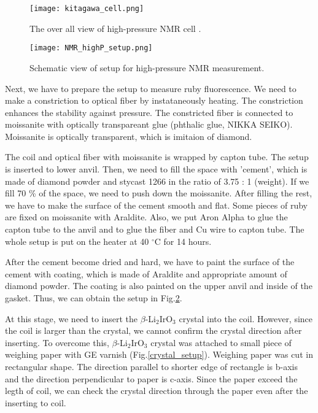 \documentclass[a4,10.5pt]{report}
\begin{document}
\begin{figure}[H]
  \centering
  \texttt{[image: kitagawa\_cell.png]}
  \caption{The over all view of high-pressure NMR cell \cite{Kitagawa2010}.}
  \label{kitagawa_cell}
\end{figure}

\begin{figure}
  \centering
  \texttt{[image: NMR\_highP\_setup.png]}
  \caption{Schematic view of setup for high-pressure NMR measurement.}
  \label{NMR_highP_setup}
\end{figure}

Next, we have to prepare the setup to measure ruby fluorescence.
We need to make a constriction to optical fiber by instataneously heating.
The constriction enhances the stability against pressure.
The constricted fiber is connected to moissanite with optically transpareant glue (phthalic glue, NIKKA SEIKO).
Moissanite is optically transparent, which is imitaion of diamond.

The coil and optical fiber with moissanite is wrapped by capton tube.
The setup is inserted to lower anvil.
Then, we need to fill the space with 'cement', which is made of diamond powder and stycast 1266 in the ratio of 3.75 : 1 (weight).
If we fill 70 \% of the space, we need to push down the moissanite.
After filling the rest, we have to make the surface of the cement smooth and flat.
Some pieces of ruby are fixed on moissanite with Araldite.
Also, we put Aron Alpha to glue the capton tube to the anvil and to glue the fiber and Cu wire to capton tube.
The whole setup is put on the heater at 40 ${}^\circ$C for 14 hours.

After the cement become dried and hard, we have to paint the surface of the cement with coating, which is made of Araldite and appropriate amount of diamond powder.
The coating is also painted on the upper anvil and inside of the gasket.
Thus, we can obtain the setup in Fig.\ref{NMR_highP_setup}.

At this stage, we need to insert the $\beta$-Li$_2$IrO$_3$ crystal into the coil.
However, since the coil is larger than the crystal, we cannot confirm the crystal direction after inserting.
To overcome this, $\beta$-Li$_2$IrO$_3$ crystal was attached to small piece of weighing paper with GE varnish (Fig.\ref{crystal_setup}).
Weighing paper was cut in rectangular shape.
The direction parallel to shorter edge of rectangle is b-axis and the direction perpendicular to paper is c-axis.
Since the paper exceed the legth of coil, we can check the crystal direction through the paper even after the inserting to coil.
\end{document}

